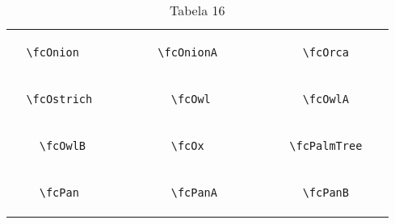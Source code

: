 \documentclass[x11names]{article}
\begin{document}
\begin{table}[H]
\begin{tabular}{|c|c|c|c|c|c|}
		&\multirow{5}{*}{	\fcOnion	[scale=0.4]} & &\multirow{5}{*}{	\fcOnionA	[scale=0.4]} & &\multirow{5}{*}{	\fcOrca	[scale=0.3]}\\	& & & & & \\	& & & & & \\	\verb|	\fcOnion	| & & \verb|	\fcOnionA	| & & \verb|	\fcOrca	| & \\	& & & & & \\	& & & & & \\	& & & & & \\	\hline									
		&\multirow{5}{*}{	\fcOstrich	[scale=0.4]} & &\multirow{5}{*}{	\fcOwl	[scale=0.4]} & &\multirow{5}{*}{	\fcOwlA	[scale=0.8]}\\	& & & & & \\	& & & & & \\	\verb|	\fcOstrich	| & & \verb|	\fcOwl	| & & \verb|	\fcOwlA	| & \\	& & & & & \\	& & & & & \\	& & & & & \\	\hline									
		&\multirow{5}{*}{	\fcOwlB	[scale=0.4]} & &\multirow{5}{*}{	\fcOx	[scale=0.4]} & &\multirow{5}{*}{	\fcPalmTree	[scale=0.3]}\\	& & & & & \\	& & & & & \\	\verb|	\fcOwlB	| & & \verb|	\fcOx	| & & \verb|	\fcPalmTree	| & \\	& & & & & \\	& & & & & \\	& & & & & \\	\hline									
		&\multirow{5}{*}{	\fcPan	[scale=0.4]} & &\multirow{5}{*}{	\fcPanA	[scale=0.4]} & &\multirow{5}{*}{	\fcPanB	[scale=0.4]}\\	& & & & & \\	& & & & & \\	\verb|	\fcPan	| & & \verb|	\fcPanA	| & & \verb|	\fcPanB	| & \\	& & & & & \\	& & & & & \\	& & & & & \\		\hline 	\hline 	\end{tabular}	\caption{	Tabela 16	}\label{	Tab16	}\end{table}
\end{document}
